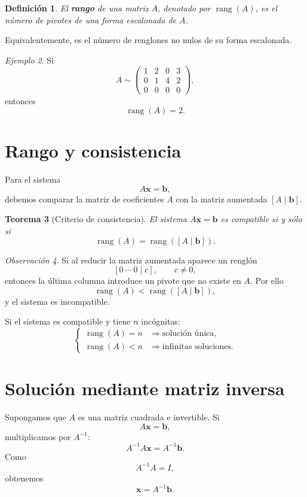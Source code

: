 \documentclass[12pt]{article}
\newtheorem{definicion}{Definición}[section]
\newtheorem{teorema}[definicion]{Teorema}
\theoremstyle{remark}
\newtheorem{observacion}[definicion]{Observación}
\newtheorem{ejemplo}[definicion]{Ejemplo}
\newcommand{\rank}{\operatorname{rang}}
\begin{document}
\begin{definicion}
El \textbf{rango} de una matriz $A$, denotado por $\rank(A)$, es el número de pivotes de una forma
escalonada de $A$.
\end{definicion}

Equivalentemente, es el número de renglones no nulos de su forma escalonada.

\begin{ejemplo}
Si
\[
A\sim
\begin{pmatrix}
1&2&0&3\\
0&1&4&2\\
0&0&0&0
\end{pmatrix},
\]
entonces
\[
\rank(A)=2.
\]
\end{ejemplo}

\section{Rango y consistencia}

Para el sistema
\[
A\mathbf{x}=\mathbf b,
\]
debemos comparar la matriz de coeficientes $A$ con la matriz aumentada $[A\mid\mathbf b]$.

\begin{teorema}[Criterio de consistencia]
El sistema $A\mathbf{x}=\mathbf b$ es compatible si y sólo si
\[
\rank(A)=\rank([A\mid\mathbf b]).
\]
\end{teorema}

\begin{observacion}
Si al reducir la matriz aumentada aparece un renglón
\[
[0\ \cdots\ 0\mid c],\qquad c\neq0,
\]
entonces la última columna introduce un pivote que no existe en $A$. Por ello
\[
\rank(A)<\rank([A\mid\mathbf b]),
\]
y el sistema es incompatible.
\end{observacion}

Si el sistema es compatible y tiene $n$ incógnitas:
\[
\begin{cases}
\rank(A)=n &\Longrightarrow \text{solución única},\\
\rank(A)<n &\Longrightarrow \text{infinitas soluciones}.
\end{cases}
\]

\section{Solución mediante matriz inversa}

Supongamos que $A$ es una matriz cuadrada e invertible. Si
\[
A\mathbf{x}=\mathbf b,
\]
multiplicamos por $A^{-1}$:
\[
A^{-1}A\mathbf{x}=A^{-1}\mathbf b.
\]
Como
\[
A^{-1}A=I,
\]
obtenemos
\[
\boxed{\mathbf{x}=A^{-1}\mathbf b.}
\]
\end{document}
